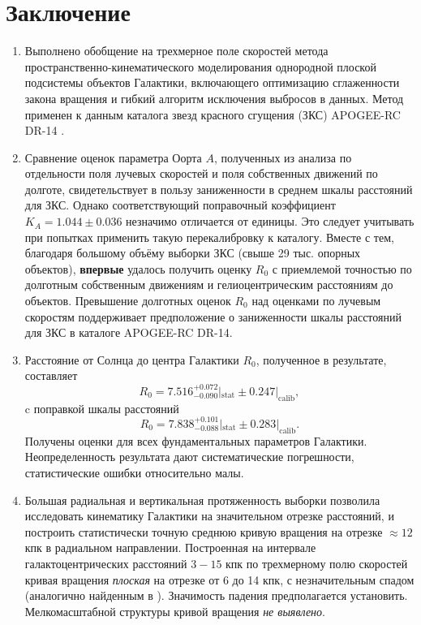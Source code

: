 \documentclass{matmex-diploma-custom}
\begin{document}
\pagebreak
\section*{Заключение}
\begin{enumerate}
        \item Выполнено обобщение на трехмерное поле скоростей метода \cite{NIIm} пространст\-вен\-но-кинематического моделирования однородной плоской подсистемы объектов Галактики, включающего оптимизацию сглаженности закона вращения и гибкий алгоритм исключения выбросов в данных. Метод применен к данным каталога звезд красного сгущения (ЗКС) APOGEE-RC DR-14 \cite{DRdata}.
        \item Сравнение оценок параметра Оорта $A$, полученных из анализа по отдельности поля лучевых скоростей и поля собственных движений по долготе, свидетельствует в пользу заниженности в среднем шкалы \cite{Laney} расстояний для ЗКС. Однако соответствующий поправочный коэффициент $K_A = 1.044 \pm 0.036$ незначимо отличается от единицы. Это следует учитывать при попытках применить такую перекалибровку к каталогу. Вместе с тем, благодаря большому объёму выборки ЗКС (свыше 29 тыс. опорных объектов), \textbf{впервые} удалось получить оценку $R_0$ с приемлемой точностью по долготным собственным движениям и гелиоцентрическим расстояниям до объектов. Превышение долготных оценок $R_0$ над оценками по лучевым скоростям поддерживает предположение о заниженности шкалы расстояний для ЗКС в каталоге APOGEE-RC DR-14. 
        \item Расстояние от Солнца до центра Галактики $R_0$, полученное в результате, составляет
                \begin{equation}
                        R_0 = 7.516^{+0.072}_{-0.090}|_{\mathrm{stat}} \pm 0.247 |_{\mathrm{calib}} ,
                \end{equation}
                c поправкой шкалы расстояний
                \begin{equation}
                        R_0 = 7.838^{+0.101}_{-0.088}|_{\mathrm{stat}} \pm 0.283 |_{\mathrm{calib}} .
                \end{equation}
                Получены оценки для всех фундаментальных параметров Галактики. Неопределенность результата дают систематические погрешности, статистические ошибки относительно малы. 
        \item Большая радиальная и вертикальная протяженность выборки позволила исследовать кинематику Галактики на значительном отрезке расстояний, и построить статистически точную среднюю кривую вращения на отрезке $\approx 12$ кпк в радиальном направлении. Построенная на интервале галактоцентрических расстояний $3-15$ кпк по трехмерному полю скоростей кривая вращения \textit{плоская} на отрезке от 6 до 14 кпк, с незначительным спадом (аналогично найденным в \cite{Rastorguev, Baikbob}). Значимость падения предполагается установить. Мелкомасштабной структуры кривой вращения \textit{не выявлено}.
\end{enumerate}
\setmonofont[Mapping=tex-text]{CMU Typewriter Text}
\pagebreak


\pagebreak
\end{document}
